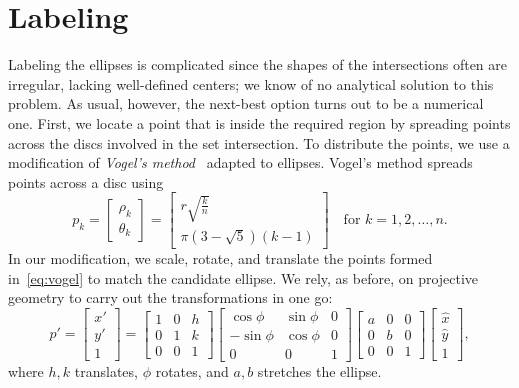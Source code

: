 \documentclass[
  oneside,
  openany,
  numbers=noendperiod,
  parskip=half,
  bibliography=totoc
]{scrbook}\usepackage[]{graphicx}\usepackage{xcolor}
\begin{document}
\section{Labeling}
\label{sec:labeling}

Labeling the ellipses is complicated since the shapes of the intersections
often are irregular, lacking well-defined centers; we know of no analytical
solution to this problem. As usual, however, the next-best option turns out to
be a numerical one. First, we locate a point that is inside the required region
by spreading points across the discs involved in the set intersection. To
distribute the points, we use a modification of
\emph{Vogel's method}~\citep{Arthur_2015,Vogel_1979} adapted to ellipses.
Vogel's method spreads points across a disc using
\begin{equation}
p_k =
\begin{bmatrix}
  \rho_k \\
  \theta_k
\end{bmatrix} =
\begin{bmatrix}
  r \sqrt{\frac{k}{n}}\\
  \pi (3 - \sqrt{5})(k - 1)
\end{bmatrix}\quad\text{for } k = 1, 2,\dots, n.
\label{eq:vogel}
\end{equation}
In our modification, we scale, rotate, and translate the points formed
in~\eqref{eq:vogel} to match the candidate ellipse. We rely, as before, on
projective geometry to carry out the transformations in one go:
\[
p' =
\begin{bmatrix}
  x' \\
  y' \\
  1
\end{bmatrix} =
\begin{bmatrix}
  1 & 0 & h \\
  0 & 1 & k \\
  0 & 0 & 1
\end{bmatrix}
\begin{bmatrix}
  \cos{\phi}  & \sin{\phi} & 0 \\
  -\sin{\phi} & \cos{\phi} & 0\\
  0           & 0          & 1
\end{bmatrix}
\begin{bmatrix}
  a & 0 & 0 \\
  0 & b & 0 \\
  0 & 0 & 1
\end{bmatrix}
\begin{bmatrix}
  \hat{x} \\
  \hat{y} \\
  1
\end{bmatrix},
\]
where $h,k$ translates, $\phi$ rotates, and
$a,b$ stretches the ellipse.
\end{document}

